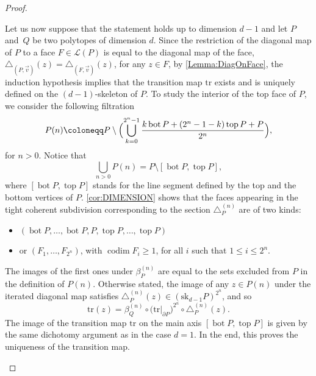 \documentclass[JEP,XML,SOM,Unicode,NoFloatCountersInSection]{cedram}
\let\mathcal\mathscr
\theoremstyle{plain}
\theoremstyle{definition}
\newcommand{\La}{\mathcal{L}}
\DeclareMathOperator{\tp}{top}
\DeclareMathOperator{\bm}{bot}
\newcommand{\sk}{\mathrm{sk}}
\newcommand{\tr}{\mathrm{tr}}
\DeclareMathOperator{\codim}{codim}
\begin{document}
\begin{proof}
\begin{enumerate}
Let us now suppose that the statement holds up to dimension $d-1$ and let $P$ and~$Q$ be two polytopes of dimension $d$. Since the restriction of the diagonal map of $P$ to a face $F\in \La(P)$ is equal to the diagonal map of the face, \ie $\triangle_{(P, \vec v)}(z)=\triangle_{(F, \vec v)}(z)$, for any $z\in F$, by \cref{Lemma:DiagOnFace}, the
induction hypothesis implies that the transition map $\tr$ exists and is uniquely defined on the $(d-1)$-skeleton of $P$.
To study the interior of the top face of $P$, we consider the following filtration
\[P(n)\coloneqq P\setminus \Bigl(\bigcup_{k=0}^{2^n-1} \frac{k\bm P+(2^n-1-k)\tp P + P}{2^n} \Bigr),\]
for $n> 0$. Notice that
\[\bigcup_{n>0} P(n)=P \setminus [\bm P, \tp P],\]
where $[\bm P, \tp P]$ stands for the line segment defined by the top and the bottom vertices of $P$.
\cref{cor:DIMENSION} shows that the faces appearing in the tight coherent subdivision
corresponding to the section
$\triangle^{(n)}_P$ are of two kinds:
\begin{itemize}
\item
$(\bm P, \ldots, \bm P, P, \tp P, \ldots, \tp P)$
\item
or $(F_1, \ldots, F_{2^n})$, with
$\codim F_i\geq 1$, for all $i$ such that $1\leq i \leq 2^n$. 
\end{itemize}
The images of the first ones under $\beta^{(n)}_P$ are equal to the sets excluded from $P$ in the definition of $P(n)$. Otherwise stated, the image of any $z\in P(n)$ under the iterated diagonal map satisfies $\triangle^{(n)}_P(z)\in \left(\sk_{d-1}P\right)^{2^n}$, and so
\[\tr(z) = \beta^{(n)}_Q\circ\big(\tr|_{\partial P}\big)^{2^n}\circ\triangle^{(n)}_P(z). \]
The image of the transition map $\tr$ on the main axis $[\bm P, \tp P]$ is given by the same dichotomy argument as in the case $d=1$. In the end, this proves the uniqueness of the transition map.


\end{enumerate}
\end{proof}
\end{document}
